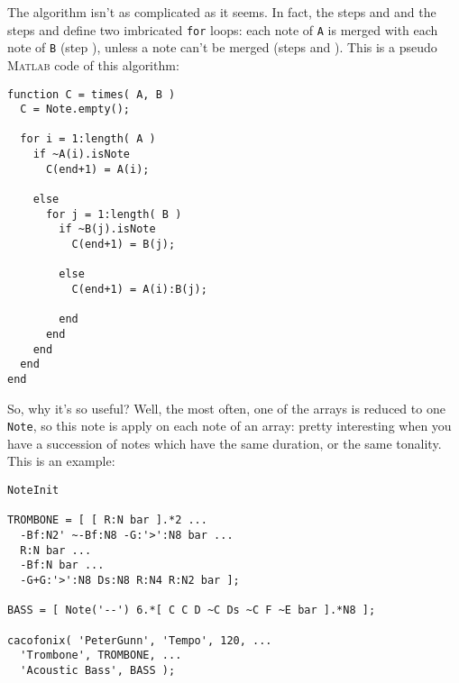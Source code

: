 \documentclass{article}
\newcommand{\matlab}{\textsc{Matlab}\xspace}
\newcommand{\note}{\lstinline!Note!\xspace}
\newcommand{\titlealgo}{}
\newcommand{\stepref}[2][]{\ifthenelse{\equal{#1}{}}{\ref{Algo \titlealgo.Step #2}}{\ref{Algo #1.Step #2}}}
\begin{document}
The algorithm isn't as complicated as it seems. In fact, the steps \stepref[T]{checki} and \stepref[T]{inci} and the steps \stepref[T]{checkj} and \stepref[T]{incj} define two imbricated \lstinline!for! loops: each note of \lstinline!A! is merged with each note of \lstinline!B! (step \stepref[T]{addAiBj}), unless a note can't be merged (steps \stepref[T]{addAi} and \stepref[T]{addBj}). This is a pseudo \matlab code of this algorithm:
\begin{lstlisting}
function C = times( A, B )
  C = Note.empty();

  for i = 1:length( A )
    if ~A(i).isNote
      C(end+1) = A(i);

    else
      for j = 1:length( B )
        if ~B(j).isNote
          C(end+1) = B(j);

        else
          C(end+1) = A(i):B(j);

        end
      end
    end
  end
end
\end{lstlisting}

So, why it's so useful? Well, the most often, one of the arrays is reduced to one \note, so this note is apply on each note of an array: pretty interesting when you have a succession of notes which have the same duration, or the same tonality. This is an example:


\begin{lstlisting}
NoteInit

TROMBONE = [ [ R:N bar ].*2 ...
  -Bf:N2' ~-Bf:N8 -G:'>':N8 bar ...
  R:N bar ...
  -Bf:N bar ...
  -G+G:'>':N8 Ds:N8 R:N4 R:N2 bar ];

BASS = [ Note('--') 6.*[ C C D ~C Ds ~C F ~E bar ].*N8 ];

cacofonix( 'PeterGunn', 'Tempo', 120, ...
  'Trombone', TROMBONE, ...
  'Acoustic Bass', BASS );
\end{lstlisting}
\end{document}
